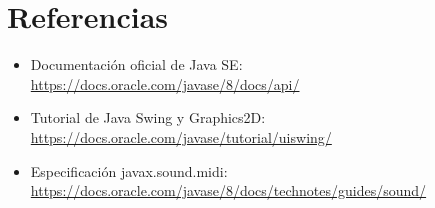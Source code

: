 \documentclass{article}
\begin{document}
\section{Referencias}
\begin{itemize}
	\item Documentación oficial de Java SE: \url{https://docs.oracle.com/javase/8/docs/api/}
	\item Tutorial de Java Swing y Graphics2D: \url{https://docs.oracle.com/javase/tutorial/uiswing/}
	\item Especificación javax.sound.midi: \url{https://docs.oracle.com/javase/8/docs/technotes/guides/sound/}
\end{itemize}
 
\printindex
 
\end{document}
